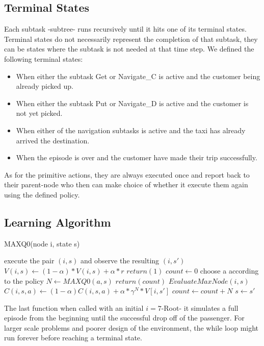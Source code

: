\documentclass[twoside,twocolumn]{article}
\begin{document}
\subsection*{Terminal States}
Each subtask -subtree- runs recursively until it hits one of its terminal states. Terminal states do not necessarily represent the completion of that subtask, they can be states where the subtask is not needed at that time step.
We defined the following terminal states:
\begin{itemize}
\item When either the subtask Get or Navigate\_C is active and the customer being already picked up.
\item When either the subtask Put or Navigate\_D is active and the customer is not yet picked.
\item When either of the navigation subtasks is active and the taxi has already arrived the destination.
\item When the episode is over and the customer have made their trip successfully. 
\end{itemize}
As for the primitive actions, they are always executed once and report back to their parent-node who then can make choice of whether it execute them again using the defined policy.

\subsection*{Learning Algorithm}
\begin{algorithm}
\caption{MAXQ0(node i, state s) }
\begin{algorithmic}[1]
\STATE execute the pair $(i,s)$ and observe the resulting $(i,s')$
\STATE  $V(i,s) \leftarrow (1-\alpha)*V(i,s) + \alpha * r$
\STATE  $return(1)$
\ELSE
\STATE $count \leftarrow 0$ 
\STATE choose a according to the policy
\STATE $N \leftarrow MAXQ0(a,s)$
\STATE $return(count)$
\ENDIF
\STATE $EvaluateMaxNode(i,s)$
\STATE $C(i,s,a) \leftarrow (1-\alpha)C(i,s,a) + \alpha*\gamma^N * V[i,s']$
\STATE $count \leftarrow count + N$
\STATE $s \leftarrow s'$
\ENDWHILE
\ENDIF
\end{algorithmic}
\end{algorithm}
The last function when called with an initial $i=7$-Root- it simulates a full episode from the beginning until the successful drop off of the passenger. For larger scale problems and poorer design of the environment, the while loop might run forever before reaching a terminal state.  
\end{document}
